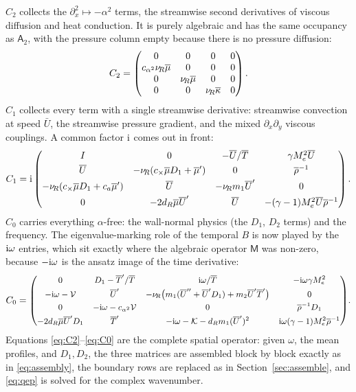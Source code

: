 \documentclass[11pt]{article}
\begin{document}
$C_2$ collects the $\partial_x^2\mapsto-\alpha^2$ terms, the streamwise second derivatives of
viscous diffusion and heat conduction. It is purely algebraic and has the same occupancy as
$\mathsf A_2$, with the pressure column empty because there is no pressure diffusion:
\begin{equation}\label{eq:C2}
  C_2=
  \begin{pmatrix}
    0 & 0 & 0 & 0\\
    c_{\alpha^2}\nu_{\!R}\overline{\mu} & 0 & 0 & 0\\
    0 & \nu_{\!R}\overline{\mu} & 0 & 0\\
    0 & 0 & \nu_{\!R}\overline{\kappa} & 0
  \end{pmatrix}.
\end{equation}
$C_1$ collects every term with a single streamwise derivative: streamwise convection at speed
$\bar U$, the streamwise pressure gradient, and the mixed $\partial_x\partial_y$ viscous
couplings. A common factor $\mathrm{i}$ comes out in front:
\begin{equation}\label{eq:C1}
  C_1=\mathrm{i}
  \begin{pmatrix}
    I & 0 & -\overline{U}/\overline{T} & \gamma M_e^2\overline{U}\\[3pt]
    \overline{U} & -\nu_{\!R}(c_\times\overline{\mu} D_1+\overline{\mu}') & 0 & \overline{\rho}^{-1}\\[3pt]
    -\nu_{\!R}(c_\times\overline{\mu} D_1+c_a\overline{\mu}') & \overline{U} & -\nu_{\!R} m_1\overline{U}' & 0\\[3pt]
    0 & -2d_R\overline{\mu}\overline{U}' & \overline{U} & -(\gamma-1)M_e^2\overline{U}\overline{\rho}^{-1}
  \end{pmatrix}.
\end{equation}
$C_0$ carries everything $\alpha$-free: the wall-normal physics (the $D_1$, $D_2$ terms) and the
frequency. The eigenvalue-marking role of the temporal $B$ is now played by the $\mathrm{i}\omega$
entries, which sit exactly where the algebraic operator $\mathsf M$ was non-zero, because
$-\mathrm{i}\omega$ is the ansatz image of the time derivative:
\begin{equation}\label{eq:C0}
  C_0={\small
  \begin{pmatrix}
    0 & D_1-\overline{T}'/\overline{T} & \mathrm{i}\omega/\overline{T} & -\mathrm{i}\omega\gamma M_e^2\\[3pt]
    -\mathrm{i}\omega-\mathcal V & \overline{U}' & -\nu_{\!R}\big(m_1(\overline{U}''+\overline{U}'D_1)+m_2\overline{U}'\overline{T}'\big) & 0\\[3pt]
    0 & -\mathrm{i}\omega-c_{\alpha^2}\mathcal V & 0 & \overline{\rho}^{-1}D_1\\[3pt]
    -2d_R\overline{\mu}\overline{U}'D_1 & \overline{T}' & -\mathrm{i}\omega-\mathcal K-d_Rm_1(\overline{U}')^2 & \mathrm{i}\omega(\gamma-1)M_e^2\overline{\rho}^{-1}
  \end{pmatrix}}.
\end{equation}
Equations \eqref{eq:C2}--\eqref{eq:C0} are the complete spatial operator: given $\omega$, the mean
profiles, and $D_1,D_2$, the three matrices are assembled block by block exactly as in
\eqref{eq:assembly}, the boundary rows are replaced as in Section~\ref{sec:assemble}, and
\eqref{eq:qep} is solved for the complex wavenumber.
\end{document}
